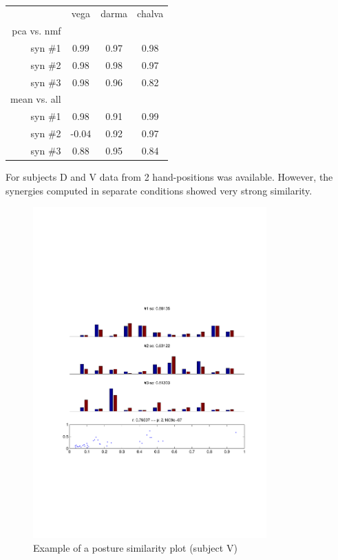 \begin{table}[ht]
	\centering
	\begin{tabular}{r|c|c|c}
		\toprule
		                    & vega  & darma & chalva \\
		pca vs. nmf         &       &       & \\
		syn \#1              & 0.99  & 0.97  & 0.98\\
		syn \#2              & 0.98  & 0.98  & 0.97\\
		syn \#3              & 0.98  & 0.96  & 0.82\\
		\midrule
		mean vs. all        &       &       & \\
		syn \#1              & 0.98  & 0.91  & 0.99\\
		syn \#2              & -0.04 & 0.92  & 0.97\\
		syn \#3              & 0.88  & 0.95  & 0.84\\
		\bottomrule
	\end{tabular}
	\caption{}
	\label{sg:tab:syn_consist}
\end{table}


For subjects D and V data from 2 hand-positions was available. However, the synergies computed in separate conditions showed very strong similarity. 
\begin{figure}[ht]
    \centering
        \includegraphics[width=0.8\textwidth]{images/post_consist_vega.pdf}
    \caption{Example of a posture similarity plot (subject V)}
    \label{sg:fig:images_post_consist_vega}
\end{figure}

